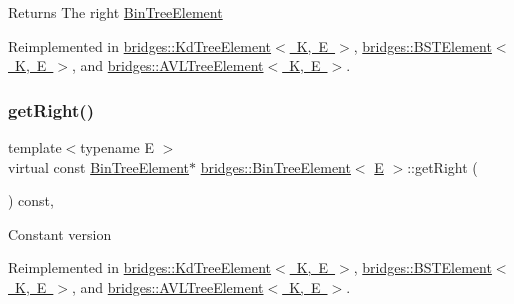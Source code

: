 \begin{DoxyReturn}{Returns}
The right \mbox{\hyperlink{classbridges_1_1_bin_tree_element}{Bin\+Tree\+Element}} 
\end{DoxyReturn}


Reimplemented in \mbox{\hyperlink{classbridges_1_1_kd_tree_element_a8e1090891a720231c2009d1d222471e9}{bridges\+::\+Kd\+Tree\+Element$<$ K, E $>$}}, \mbox{\hyperlink{classbridges_1_1_b_s_t_element_a35e93bce32de933522dccde5f2b5ffd9}{bridges\+::\+B\+S\+T\+Element$<$ K, E $>$}}, and \mbox{\hyperlink{classbridges_1_1_a_v_l_tree_element_a909b46ebf3e8c6a3434762a1f01499e2}{bridges\+::\+A\+V\+L\+Tree\+Element$<$ K, E $>$}}.

\mbox{\label{classbridges_1_1_bin_tree_element_aa01980f4be18f6c205580ea0376a0d07}} 
\subsubsection{\texorpdfstring{getRight()}{getRight()}\hspace{0.1cm}{\footnotesize\ttfamily [2/2]}}
{\footnotesize\ttfamily template$<$typename E $>$ \\
virtual const \mbox{\hyperlink{classbridges_1_1_bin_tree_element}{Bin\+Tree\+Element}}$\ast$ \mbox{\hyperlink{classbridges_1_1_bin_tree_element}{bridges\+::\+Bin\+Tree\+Element}}$<$ \mbox{\hyperlink{namespacebridges_acfb0a4f7877d8f63de3e6862004c50eda3a3ea00cfc35332cedf6e5e9a32e94da}{E}} $>$\+::get\+Right (\begin{DoxyParamCaption}{ }\end{DoxyParamCaption}) const\hspace{0.3cm}{\ttfamily [inline]}, {\ttfamily [virtual]}}

Constant version 

Reimplemented in \mbox{\hyperlink{classbridges_1_1_kd_tree_element_a48e6a81eccf6d156e50865ef8066be82}{bridges\+::\+Kd\+Tree\+Element$<$ K, E $>$}}, \mbox{\hyperlink{classbridges_1_1_b_s_t_element_ae4e7b750eada97074a42e7f54b320a29}{bridges\+::\+B\+S\+T\+Element$<$ K, E $>$}}, and \mbox{\hyperlink{classbridges_1_1_a_v_l_tree_element_a2f6fd127f3a04fcc5be60299b7d98f12}{bridges\+::\+A\+V\+L\+Tree\+Element$<$ K, E $>$}}.

\mbox{\label{classbridges_1_1_bin_tree_element_a8f90f7f4c8da058ebfca64dd3728c50f}} 
